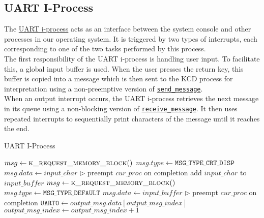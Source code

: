 \documentclass[12pt]{report}
\begin{document}
\subsection{UART I-Process}
\label{subsec:UART I-Process}

The \hyperref[alg:uartiprocess]{UART i-process} acts as an interface between the system console and other processes in our operating system. It is triggered by two types of interrupts, each corresponding to one of the two tasks performed by this process.\\

The first responsibility of the UART i-process is handling user input. To facilitate this, a global input buffer is used. When the user presses the return key, this buffer is copied into a message which is then sent to the KCD process for interpretation using a non-preemptive version of \hyperref[alg:sendingmessages]{\texttt{send_message}}.\\

When an output interrupt occurs, the UART i-process retrieves the next message in its queue using a non-blocking version of \hyperref[alg:receivingmessages]{\texttt{receive_message}}. It then uses repeated interrupts to sequentially print characters of the message until it reaches the end.\\

\begin{algorithm}
\caption{UART I-Process}
\label{alg:uartiprocess}
\begin{algorithmic}[1]
         
            \State $msg \leftarrow \Call{k\_request\_memory\_block}{\null}$
            \State $msg.type \leftarrow \texttt{MSG_TYPE_CRT_DISP}$
            \State $msg.data \leftarrow input\_char$
            \State {}
            \State $\triangleright$ preempt $cur\_proc$ on completion
        \EndIf
                \State add $input\_char$ to $\mathit{input\_buffer}$
            \Else
                \State $msg \leftarrow \Call{k\_request\_memory\_block}{\null}$
                \State $msg.type \leftarrow \texttt{MSG_TYPE_DEFAULT}$
                \State $msg.data \leftarrow \mathit{input\_buffer}$
                \State {} 
                \State $\triangleright$ preempt $cur\_proc$ on completion
            \EndIf
        \State $\texttt{UART0} \leftarrow output\_msg.data[output\_msg\_index]$
        \State $output\_msg\_index \leftarrow output\_msg\_index + 1$
    \EndIf
\EndProcedure
\end{algorithmic}
\end{algorithm}
\end{document}
